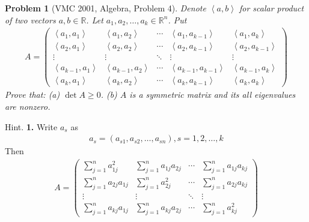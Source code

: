 \documentclass{article}
\newtheorem{problem}{Problem}
\begin{document}
\begin{problem}[VMC 2001, Algebra, Problem 4]
	Denote $\left\langle {a,b} \right\rangle $ for scalar product of two vectors $a,b \in \mathbb{R}$. Let ${a_1},{a_2}, \ldots ,{a_k} \in {\mathbb{R}^n}$. Put
	\begin{align}
		A = \left( {\begin{array}{*{20}{c}}
				{\left\langle {{a_1},{a_1}} \right\rangle }&{\left\langle {{a_1},{a_2}} \right\rangle }& \cdots &{\left\langle {{a_1},{a_{k - 1}}} \right\rangle }&{\left\langle {{a_1},{a_k}} \right\rangle }\\
				{\left\langle {{a_2},{a_1}} \right\rangle }&{\left\langle {{a_2},{a_2}} \right\rangle }& \cdots &{\left\langle {{a_2},{a_{k - 1}}} \right\rangle }&{\left\langle {{a_2},{a_{k - 1}}} \right\rangle }\\
				\vdots & \vdots & \ddots & \vdots & \vdots \\
				{\left\langle {{a_{k - 1}},{a_1}} \right\rangle }&{\left\langle {{a_{k - 1}},{a_2}} \right\rangle }& \cdots &{\left\langle {{a_{k - 1}},{a_{k - 1}}} \right\rangle }&{\left\langle {{a_{k - 1}},{a_k}} \right\rangle }\\
				{\left\langle {{a_k},{a_1}} \right\rangle }&{\left\langle {{a_k},{a_2}} \right\rangle }& \cdots &{\left\langle {{a_k},{a_{k - 1}}} \right\rangle }&{\left\langle {{a_k},{a_k}} \right\rangle }
		\end{array}} \right)
	\end{align}
	Prove that: (a) $\det A \ge 0$. (b) $A$ is a symmetric matrix and its all eigenvalues are nonzero.	
\end{problem}
{\sf Hint.} \textbf{1.} Write $a_s$ as
\begin{align}
	{a_s} = \left( {{a_{s1}},{a_{s2}}, \ldots ,{a_{sn}}} \right),s = 1,2, \ldots ,k
\end{align}
Then 
\begin{align}
	A = \left( {\begin{array}{*{20}{c}}
			{\sum\limits_{j = 1}^n {a_{1j}^2} }&{\sum\limits_{j = 1}^n {{a_{1j}}{a_{2j}}} }& \cdots &{\sum\limits_{j = 1}^n {{a_{1j}}{a_{kj}}} }\\
			{\sum\limits_{j = 1}^n {{a_{2j}}{a_{1j}}} }&{\sum\limits_{j = 1}^n {a_{2j}^2} }& \cdots &{\sum\limits_{j = 1}^n {{a_{2j}}{a_{kj}}} }\\
			\vdots & \vdots & \ddots & \vdots \\
			{\sum\limits_{j = 1}^n {{a_{kj}}{a_{1j}}} }&{\sum\limits_{j = 1}^n {{a_{kj}}{a_{2j}}} }& \cdots &{\sum\limits_{j = 1}^n {a_{kj}^2} }
	\end{array}} \right)
\end{align}
\end{document}
